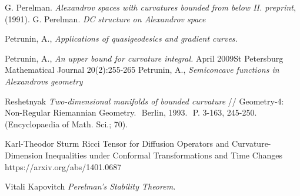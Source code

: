 \documentclass[a4paper,10pt]{article}
\begin{document}
\begin{thebibliography}{52}
 G. Perelman. \textit{Alexandrov spaces with curvatures bounded from below II. preprint}, (1991).
 G. Perelman. \textit{DC structure on Alexandrov space}

 Petrunin, A., \textit{Applications of quasigeodesics
and gradient curves.}

 Petrunin, A., \textit{An upper bound for curvature integral.} April 2009St Petersburg Mathematical Journal 20(2):255-265
 Petrunin, A., \textit{Semiconcave functions in Alexandrovs geometry}




 Reshetnyak \textit{ Two-dimensional manifolds of bounded curvature} // Geometry-4: Non-Regular Riemannian Geometry.  Berlin, 1993.  P. 3-163, 245-250.  (Encyclopaedia of Math. Sci.; 70). 

 Karl-Theodor Sturm
Ricci Tensor for Diffusion Operators and Curvature-Dimension Inequalities under Conformal Transformations and Time Changes
https://arxiv.org/abs/1401.0687
 


Vitali Kapovitch \textit{Perelman's Stability Theorem.}
\end{thebibliography}
 
\end{document}
